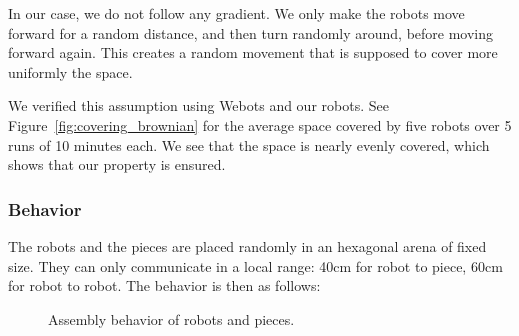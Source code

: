 	In our case, we do not follow any gradient. We only make the robots move forward for a random distance, and then turn randomly around, before moving forward again. This creates a random movement that is supposed to cover more uniformly the space.
	
	We verified this assumption using Webots and our robots. See Figure~\ref{fig:covering_brownian} for the average space covered by five robots over 5 runs of 10 minutes each. We see that the space is nearly evenly covered, which shows that our property is ensured.
	
	
	
	\subsubsection{Behavior} %
	\label{ssub:behavior}
		The robots and the pieces are placed randomly in an hexagonal arena of fixed size. They can only communicate in a local range: 40cm for robot to piece, 60cm for robot to robot. The behavior is then as follows:
		
		\begin{figure}[h]
			\centering
			\; %
			\; %
			\; %
			\caption{Assembly behavior of robots and pieces.}
		\label{fig:behavior_webots_assembly} %
		\end{figure}
		
